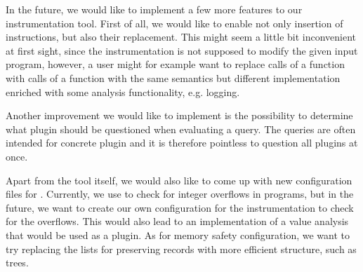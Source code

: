 In the future, we would like to implement a few more features to our
instrumentation tool. First of all, we would like to enable not only insertion
of instructions, but also their replacement. This might seem a little bit
inconvenient at first sight, since the instrumentation is not supposed to
modify the given input program, however, a user might for example want to
replace calls of a function with calls of a function with the same semantics
but different implementation enriched with some analysis functionality, e.g.
logging.

Another improvement we would like to implement is the possibility to determine
what plugin should be questioned when evaluating a query. The queries are often
intended for concrete plugin and it is therefore pointless to question all
plugins at once.

Apart from the tool itself, we would also like to come up with new
configuration files for \symbiotic. Currently, we use \clang to check for
integer overflows in programs, but in the future, we want to create our own
configuration for the instrumentation to check for the overflows. This would
also lead to an implementation of a value analysis that would be used as a plugin.
As for memory safety configuration, we want to try replacing the lists for
preserving records with more efficient structure, such as trees.
